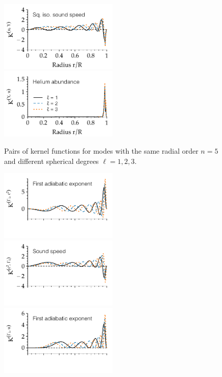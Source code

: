 {\begin{figure}
    \includegraphics[width=0.5\textwidth]{figs/pulse/kernels/kernel-ell-u_Y-diffusion.pdf}%
    \includegraphics[width=0.5\textwidth]{figs/pulse/kernels/kernel-ell-Y_u-diffusion.pdf}
    \caption[Kernel functions (same $n$, different $\ell$)]{Pairs of kernel functions for modes with the same radial order ${n=5}$ and different spherical degrees ${\ell=1},2,3$. \label{fig:same-n}}
\end{figure}
\begin{figure}
    \centering
    \includegraphics[width=0.5\textwidth,trim={0 1.1cm 0 0}, clip]{figs/pulse/kernels/kernel-n-Gamma1_c2-diffusion.pdf}%
    \includegraphics[width=0.5\textwidth,trim={0 1.1cm 0 0}, clip]{figs/pulse/kernels/kernel-n-c2_Gamma1-diffusion.pdf}\\
    \includegraphics[width=0.5\textwidth,trim={0 1.1cm 0 0}, clip]{figs/pulse/kernels/kernel-n-Gamma1_u-diffusion.pdf}%

\end{figure}}
